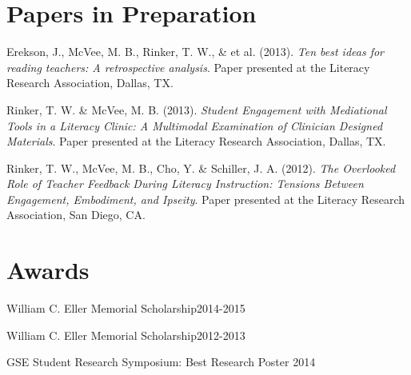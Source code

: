 \section{Papers in Preparation}
\vspace{-.1in}
\begin{bibsection}

\item Erekson, J., McVee, M. B., Rinker, T. W., \& et al. (2013). \emph{Ten best ideas for reading teachers: A retrospective analysis}. Paper presented at the Literacy Research Association, Dallas, TX.

\item Rinker, T. W. \& McVee, M. B. (2013).  \emph{Student Engagement with Mediational Tools in a Literacy Clinic: A Multimodal Examination of Clinician Designed Materials}.  Paper presented at the Literacy Research Association, Dallas, TX.

\item Rinker, T. W., McVee, M. B., Cho, Y. \& Schiller, J. A. (2012).  \emph{The Overlooked Role of Teacher Feedback During Literacy Instruction: Tensions Between Engagement, Embodiment, and Ipseity}.  Paper presented at the Literacy Research Association, San Diego, CA.



\end{bibsection}

\section{Awards}
\begin{innerlist}
    \item William C. Eller Memorial Scholarship\hfill 2014-2015
    \item William C. Eller Memorial Scholarship\hfill 2012-2013
    \item GSE Student Research Symposium: Best Research Poster \hfill 2014
\end{innerlist}

\halfblankline

